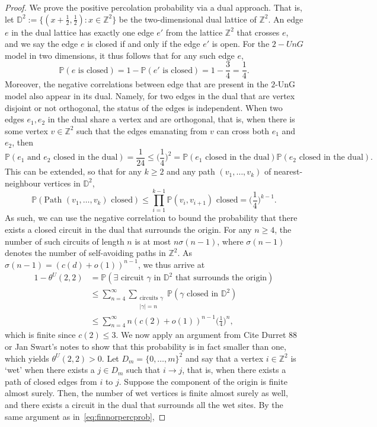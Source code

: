 \documentclass{article}
\theoremstyle{definition}
\renewcommand{\P}{\mathbb{P}}
\newcommand{\1}{\mathbbm{1}}
\newcommand{\0}{\mathbf{o}}
\newcommand{\Z}{\mathbb{Z}}
\newcommand*{\be}{\begin{equation}}
\newcommand*{\ee}{\end{equation}}
\newcommand*{\ba}{\begin{aligned}}
\newcommand*{\ea}{\end{aligned}}
\newcommand{\D}{\mathbb D}
\begin{document}
\begin{proof}
    We prove the positive percolation probability via a dual approach. That is, let $\D^2:=\{(x+\frac12,\frac12): x\in \Z^2\}$ be the two-dimensional dual lattice of $\Z^2$. An edge $e$ in the dual lattice has exactly one edge $e'$ from the lattice $\Z^2$ that crosses $e$, and we say the edge $e$ is closed if and only if the edge $e'$ is open. For the $2-UnG$ model in two dimensions, it thus follows that for any such edge $e$, 
    \be 
    \P(e \text{ is closed})=1-\P(e'\text{ is closed})=1-\frac34=\frac14.
    \ee 
    Moreover, the negative correlations between edge that are present in the $2$-UnG model also appear in its dual. Namely, for two edges in the dual that are vertex disjoint or not orthogonal, the status of the edges is independent. When two edges $e_1,e_2$ in the dual share a vertex and are orthogonal, that is, when there is some vertex $v\in \Z^2$ such that the edges emanating from $v$ can cross both $e_1$ and $e_2$, then
    \be 
    \P(e_1\text{ and }e_2\text{ closed in the dual})=\frac{1}{24}\leq \Big(\frac14\Big)^2=\P(e_1\text{ closed in the dual})\P(e_2\text{ closed in the dual}).
    \ee 
    This can be extended, so that for any $k\geq 2$ and any path $(v_1,\ldots, v_k)$ of nearest-neighbour vertices in $\D^2$, 
    \be 
    \P(\text{Path }(v_1,\ldots, v_k)\text{ closed})\leq \prod_{i=1}^{k-1}\P{(v_i,v_{i+1})\text{ closed}}=\Big(\frac14\Big)^{k-1}.
    \ee 
    As such, we can use the negative correlation to bound the probability that there exists a closed circuit in the dual that surrounds the origin. For any $n\geq 4$, the number of such circuits of length $n$ is at most $n\sigma(n-1)$, where $\sigma(n-1)$ denotes the number of self-avoiding paths in $\Z^2$. As $\sigma(n-1)=(c(d)+o(1))^{n-1}$, we thus arrive at 
    \be \ba\label{eq:finnorpercprob}
    1-\theta^U(2,2)&=\P(\exists \text{ circuit }\gamma \text{ in }\D^2\text{ that surrounds the origin})\\
    &\leq \sum_{n=4}^\infty \sum_{\substack{\text{circuits }\gamma\\ |\gamma|=n}}\P(\gamma\text{ closed in }\D^2)\\
    &\leq \sum_{n=4}^\infty n(c(2)+o(1))^{n-1} \Big(\frac14\Big)^n, 
    \ea \ee 
    which is finite since $c(2)\leq 3$. We now apply an argument from {\color{red} Cite Durret 88 or Jan Swart's notes} to show that this probability is in fact smaller than one, which yields $\theta^U(2,2)>0$. Let $D_m=\{0,\ldots, m\}^2$ and say that a vertex $i\in \Z^2$ is `wet' when there exists a $j\in D_m$ such that $i\to j$, that is, when there exists a path of closed edges from $i$ to $j$. Suppose the component of the origin is finite almost surely. Then, the number of wet vertices is finite almost surely as well, and there exists a circuit in the dual that surrounds all the wet sites. By the same argument as in~\eqref{eq:finnorpercprob}, 

\end{proof}
\end{document}
